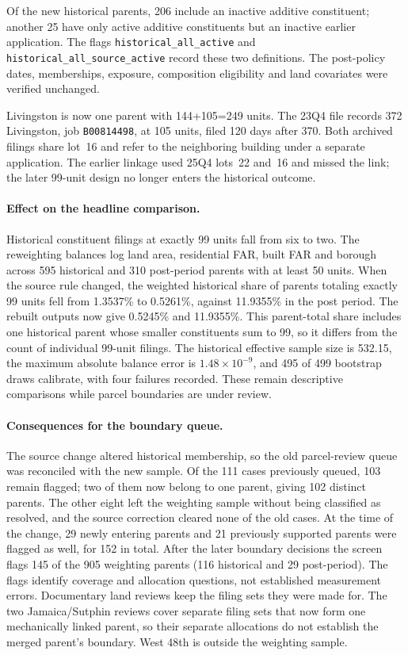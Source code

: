 Of the new historical parents, 206 include an inactive additive constituent;
another 25 have only active additive constituents but an inactive earlier
application. The flags \texttt{historical\_all\_active} and
\texttt{historical\_all\_source\_active} record these two definitions. The
post-policy dates, memberships, exposure, composition eligibility and land
covariates were verified unchanged.

Livingston is now one parent with 144+105=249 units. The 23Q4 file records 372
Livingston, job \texttt{B00814498}, at 105 units, filed 120 days after 370.
Both archived filings share lot~16 and refer to the neighboring building under
a separate application. The earlier linkage used 25Q4 lots~22 and~16 and missed
the link; the later 99-unit design no longer enters the historical outcome.

\paragraph{Effect on the headline comparison.}
Historical constituent filings at exactly 99 units fall from six to
two. The reweighting balances log land area, residential FAR, built FAR
and borough across 595 historical and 310 post-period parents with at
least 50 units. When the source rule changed, the weighted historical share of
parents totaling exactly 99 units fell from 1.3537\% to 0.5261\%, against
11.9355\% in the post period. The rebuilt outputs now give
0.5245\% and 11.9355\%. This parent-total share includes one
historical parent whose smaller constituents sum to 99, so it differs from the
count of individual 99-unit filings. The historical effective sample size is
532.15, the maximum absolute balance error is
$1.48\times10^{-9}$, and 495 of 499 bootstrap draws calibrate,
with four failures recorded. These remain descriptive comparisons while
parcel boundaries are under review.

\paragraph{Consequences for the boundary queue.}
The source change altered historical membership, so the old parcel-review
queue was reconciled with the new sample. Of the 111 cases previously queued,
103 remain flagged; two of them now belong to one parent, giving 102 distinct
parents. The other eight left the weighting sample without being classified as
resolved, and the source correction cleared none of the old cases. At the time
of the change, 29 newly entering parents and 21 previously supported parents
were flagged as well, for 152 in total. After the later boundary decisions the
screen flags 145 of the 905 weighting parents
(116 historical and 29 post-period). The flags
identify coverage and allocation questions, not established measurement
errors. Documentary land reviews keep the filing sets they were made for. The
two Jamaica/Sutphin reviews cover separate filing sets that now form one
mechanically linked parent, so their separate allocations do not establish the
merged parent's boundary. West 48th is outside the weighting sample.

